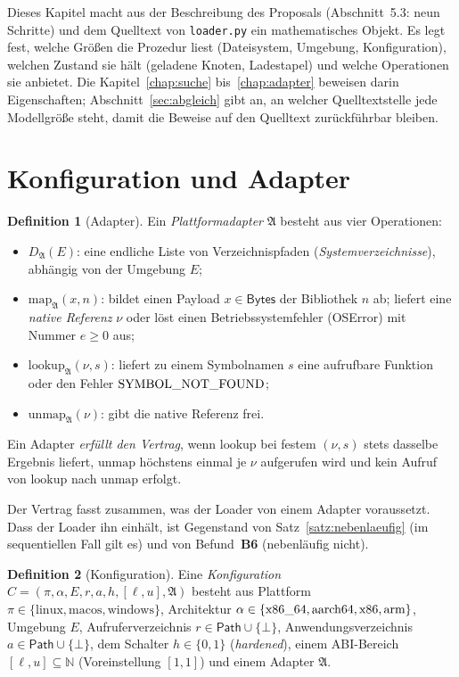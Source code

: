 \documentclass[a4paper,12pt,twoside]{report}
\DeclareRobustCommand{\_}{\ifmmode\mbox{\textunderscore}\else\textunderscore\allowbreak{}\fi}
\theoremstyle{definition}
\newtheorem{definition}{Definition}[chapter]
\newcommand{\Bf}[1]{\textbf{B#1}}
\newcommand{\N}{\mathbb{N}}
\newcommand{\Path}{\mathsf{Path}}
\newcommand{\Bytes}{\mathsf{Bytes}}
\begin{document}
Dieses Kapitel macht aus der Beschreibung des Proposals (Abschnitt~5.3: neun Schritte) und dem Quelltext von \texttt{loader.py} ein mathematisches Objekt. Es legt fest, welche Größen die Prozedur liest (Dateisystem, Umgebung, Konfiguration), welchen Zustand sie hält (geladene Knoten, Ladestapel) und welche Operationen sie anbietet. Die Kapitel~\ref{chap:suche} bis~\ref{chap:adapter} beweisen darin Eigenschaften; Abschnitt~\ref{sec:abgleich} gibt an, an welcher Quelltextstelle jede Modellgröße steht, damit die Beweise auf den Quelltext zurückführbar bleiben.

\section{Konfiguration und Adapter}

\begin{definition}[Adapter]
	\label{def:adapter}
	Ein \emph{Plattformadapter} $\mathfrak A$ besteht aus vier Operationen:
	\begin{itemize}
		\item $D_{\mathfrak A}(E)$: eine endliche Liste von Verzeichnispfaden (\emph{Systemverzeichnisse}), abhängig von der Umgebung $E$;
		\item $\mathrm{map}_{\mathfrak A}(x,n)$: bildet einen Payload $x\in\Bytes$ der Bibliothek $n$ ab; liefert eine \emph{native Referenz} $\nu$ oder löst einen Betriebssystemfehler (OSError) mit Nummer $e\ge0$ aus;
		\item $\mathrm{lookup}_{\mathfrak A}(\nu,s)$: liefert zu einem Symbolnamen $s$ eine aufrufbare Funktion oder den Fehler $\mathrm{SYMBOL\_NOT\_FOUND}$;
		\item $\mathrm{unmap}_{\mathfrak A}(\nu)$: gibt die native Referenz frei.
	\end{itemize}
	Ein Adapter \emph{erfüllt den Vertrag}, wenn $\mathrm{lookup}$ bei festem $(\nu,s)$ stets dasselbe Ergebnis liefert, $\mathrm{unmap}$ höchstens einmal je $\nu$ aufgerufen wird und kein Aufruf von $\mathrm{lookup}$ nach $\mathrm{unmap}$ erfolgt.
\end{definition}

Der Vertrag fasst zusammen, was der Loader von einem Adapter voraussetzt. Dass der Loader ihn einhält, ist Gegenstand von Satz~\ref{satz:nebenlaeufig} (im sequentiellen Fall gilt es) und von Befund~\Bf{6} (nebenläufig nicht).

\begin{definition}[Konfiguration]
	\label{def:konfig}
	Eine \emph{Konfiguration} $C=(\pi,\alpha,E,r,a,h,[\ell,u],\mathfrak A)$ besteht aus Plattform $\pi\in\{\text{linux},\text{macos},\text{windows}\}$, Architektur $\alpha\in\{\text{x86\_64},\text{aarch64},\text{x86},\text{arm}\}$, Umgebung $E$, Aufruferverzeichnis $r\in\Path\cup\{\bot\}$, Anwendungsverzeichnis $a\in\Path\cup\{\bot\}$, dem Schalter $h\in\{0,1\}$ (\emph{hardened}), einem ABI-Bereich $[\ell,u]\subseteq\N$ (Voreinstellung $[1,1]$) und einem Adapter $\mathfrak A$.
\end{definition}
\end{document}
